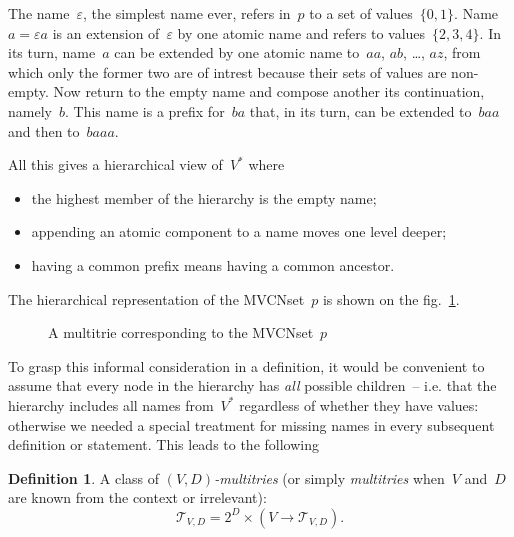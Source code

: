 \documentclass{article}
\theoremstyle{definition}
\newtheorem{Df}{Definition}
\newcommand{\setcharmt}{T}
\newcommand{\setsymbol}[3]{\mathcal{#1}_{#2,#3}}
\newcommand{\setmt}[2]{\setsymbol{\setcharmt}{#1}{#2}}
\begin{document}
The name~$\varepsilon$, the simplest name ever, refers in~$p$ to a set of
values~$\{0,1\}$. Name~$a=\varepsilon a$ is an extension of~$\varepsilon$ by
one atomic name and refers to values~$\{2,3,4\}$. In its turn, name~$a$ can
be extended by one atomic name to~$aa$, $ab$, \ldots, $az$, from which only the
former two are of intrest because their sets of values are non-empty.
Now return to the empty name and compose another its continuation, namely~$b$.
This name is a prefix for~$ba$ that, in its turn, can be extended to~$baa$ and
then to~$baaa$.

All this gives a hierarchical view of~$V^\ast$ where
\begin{itemize}
\item the highest member of the hierarchy is the empty name;
\item appending an atomic component to a name moves one level deeper;
\item having a common prefix means having a common ancestor.
\end{itemize}
The hierarchical representation of the MVCNset~$p$ is shown on the
fig.~\ref{fig:trie}.

\begin{figure}[ht]
\begin{center}
\begin{minipage}{17em}
\end{minipage}
\end{center}
\caption{A multitrie corresponding to the MVCNset~$p$}\label{fig:trie}
\end{figure}

To grasp this informal consideration in a definition, it would be convenient to
assume that every node in the hierarchy has \emph{all} possible children~-- i.e.
that the hierarchy includes all names from~$V^\ast$ regardless of whether they
have values: otherwise we needed a special treatment for missing names in
every subsequent definition or statement. This leads to the following

\begin{Df}\label{df:mt}
A class of \emph{$(V,D)$-multitries} (or simply \emph{multitries} when~$V$
and~$D$ are known from the context or irrelevant):
\[
  \setmt{V}{D} = 2^D \times (V \to \setmt{V}{D}) .
\]
\end{Df}
\end{document}
